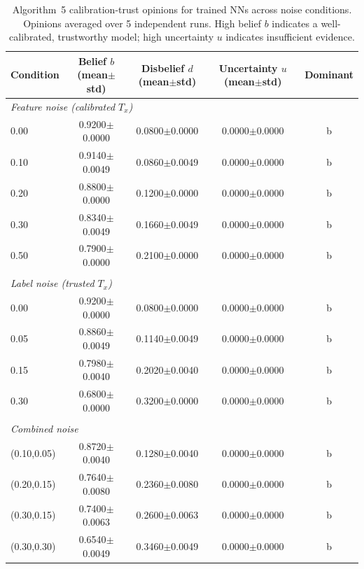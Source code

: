 \begin{table}[ht]
\centering
\caption{Algorithm~5 calibration-trust opinions for trained NNs across noise conditions. Opinions averaged over 5 independent runs. High belief $b$ indicates a well-calibrated, trustworthy model; high uncertainty $u$ indicates insufficient evidence.}
\label{tab:calibration-trust}
\begin{tabular}{lcccc}
\toprule
Condition & Belief $b$ (mean$\pm$std) & Disbelief $d$ (mean$\pm$std) & Uncertainty $u$ (mean$\pm$std) & Dominant \\
\midrule
\multicolumn{5}{l}{\textit{Feature noise (calibrated $T_x$)}} \\
0.00 & 0.9200$\pm$0.0000 & 0.0800$\pm$0.0000 & 0.0000$\pm$0.0000 & b \\
0.10 & 0.9140$\pm$0.0049 & 0.0860$\pm$0.0049 & 0.0000$\pm$0.0000 & b \\
0.20 & 0.8800$\pm$0.0000 & 0.1200$\pm$0.0000 & 0.0000$\pm$0.0000 & b \\
0.30 & 0.8340$\pm$0.0049 & 0.1660$\pm$0.0049 & 0.0000$\pm$0.0000 & b \\
0.50 & 0.7900$\pm$0.0000 & 0.2100$\pm$0.0000 & 0.0000$\pm$0.0000 & b \\
\midrule \\
\multicolumn{5}{l}{\textit{Label noise (trusted $T_x$)}} \\
0.00 & 0.9200$\pm$0.0000 & 0.0800$\pm$0.0000 & 0.0000$\pm$0.0000 & b \\
0.05 & 0.8860$\pm$0.0049 & 0.1140$\pm$0.0049 & 0.0000$\pm$0.0000 & b \\
0.15 & 0.7980$\pm$0.0040 & 0.2020$\pm$0.0040 & 0.0000$\pm$0.0000 & b \\
0.30 & 0.6800$\pm$0.0000 & 0.3200$\pm$0.0000 & 0.0000$\pm$0.0000 & b \\
\midrule \\
\multicolumn{5}{l}{\textit{Combined noise}} \\
(0.10,0.05) & 0.8720$\pm$0.0040 & 0.1280$\pm$0.0040 & 0.0000$\pm$0.0000 & b \\
(0.20,0.15) & 0.7640$\pm$0.0080 & 0.2360$\pm$0.0080 & 0.0000$\pm$0.0000 & b \\
(0.30,0.15) & 0.7400$\pm$0.0063 & 0.2600$\pm$0.0063 & 0.0000$\pm$0.0000 & b \\
(0.30,0.30) & 0.6540$\pm$0.0049 & 0.3460$\pm$0.0049 & 0.0000$\pm$0.0000 & b \\
\bottomrule
\end{tabular}
\end{table}